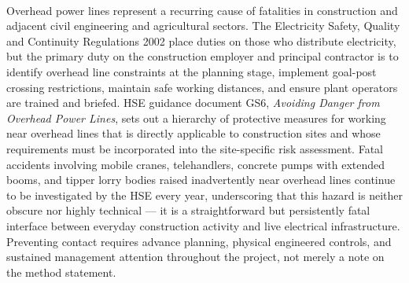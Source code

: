 \paragraph{}
Overhead power lines represent a recurring cause of fatalities in construction and adjacent civil engineering and agricultural sectors. The Electricity Safety, Quality and Continuity Regulations 2002 place duties on those who distribute electricity, but the primary duty on the construction employer and principal contractor is to identify overhead line constraints at the planning stage, implement goal-post crossing restrictions, maintain safe working distances, and ensure plant operators are trained and briefed. HSE guidance document GS6, \textit{Avoiding Danger from Overhead Power Lines}, sets out a hierarchy of protective measures for working near overhead lines that is directly applicable to construction sites and whose requirements must be incorporated into the site-specific risk assessment. Fatal accidents involving mobile cranes, telehandlers, concrete pumps with extended booms, and tipper lorry bodies raised inadvertently near overhead lines continue to be investigated by the HSE every year, underscoring that this hazard is neither obscure nor highly technical --- it is a straightforward but persistently fatal interface between everyday construction activity and live electrical infrastructure. Preventing contact requires advance planning, physical engineered controls, and sustained management attention throughout the project, not merely a note on the method statement.


